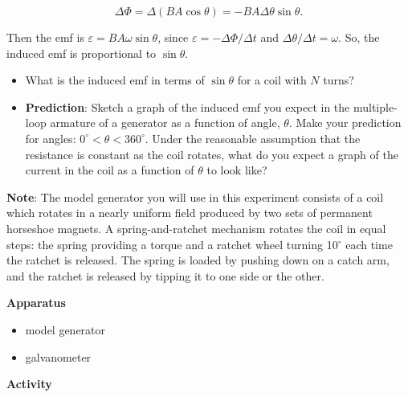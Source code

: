 \begin{displaymath} \Delta\Phi = \Delta (BA\cos\theta) = -BA\Delta\theta\sin\theta. \end{displaymath}

Then the emf is $\varepsilon = BA\omega\sin\theta$, since $\varepsilon = -\Delta\Phi/\Delta t$
and $\Delta\theta/\Delta t = \omega$. So, the induced emf is proportional
to $\sin\theta$.

\begin{itemize}
\item What is the induced emf in terms of $\sin\theta$ for a coil with $N$
turns? \vspace{15mm}

\item \textbf{Prediction}: Sketch a graph of the induced emf you expect
in the multiple-loop armature of a generator as a function of angle,
$\theta$. Make your prediction for angles: $0^\circ < \theta < 360^\circ$.
Under the reasonable assumption that the resistance is constant as
the coil rotates, what do you expect a graph of the current in the
coil as a function of $\theta$ to look like?\vspace{15mm}

\end{itemize}
\textbf{Note}: The model generator you will use in this experiment
consists of a coil which rotates in a nearly uniform field produced
by two sets of permanent horseshoe magnets. A spring-and-ratchet mechanism
rotates the coil in equal steps: the spring providing a torque and
a ratchet wheel turning 10$^\circ$ each time the ratchet is released.
The spring is loaded by pushing down on a catch arm, and the ratchet
is released by tipping it to one side or the other.

\textbf{Apparatus}

\begin{itemize}
\item model generator
\item galvanometer 
\end{itemize}
\textbf{Activity}

